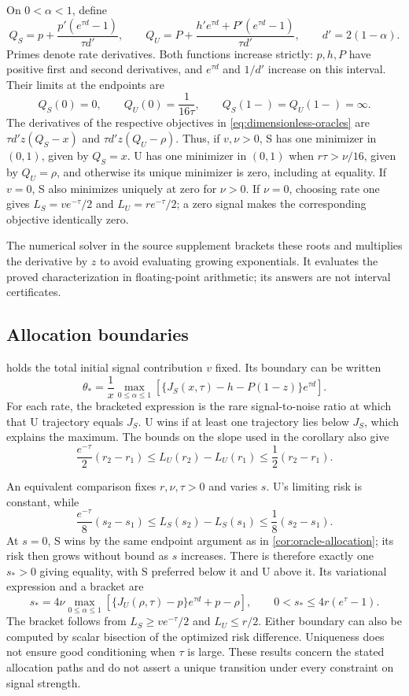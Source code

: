 \documentclass{alt2027}
\begin{document}
On $0 < \alpha < 1$, define
\[
  Q_S = p + \frac{p'(e^{\tau d} - 1)}{\tau d'},\qquad Q_U
      = P + \frac{h'e^{\tau d} + P'(e^{\tau d} - 1)}{\tau d'}, \qquad d'
      = 2(1 - \alpha).
\]
Primes denote rate derivatives. Both functions increase strictly: $p,h,P$ have
positive first and second derivatives, and $e^{\tau d}$ and $1/d'$ increase on
this interval. Their limits at the endpoints are
\[
  Q_S(0) = 0,\qquad Q_U(0) = \frac{1}{16\tau},\qquad Q_S(1-) = Q_U(1-) = \infty.
\]
The derivatives of the respective objectives in \cref{eq:dimensionless-oracles}
are $\tau d'z(Q_S - x)$ and $\tau d'z(Q_U - \rho)$. Thus, if $v,\nu > 0$, S has
one minimizer in $(0,1)$, given by $Q_S = x$. U has one minimizer in $(0,1)$
when $r\tau > \nu/16$, given by $Q_U = \rho$, and otherwise its unique minimizer
is zero, including at equality. If $v = 0$, S also minimizes uniquely at zero
for $\nu > 0$. If $\nu = 0$, choosing rate one gives $L_S = ve^{-\tau}/2$ and
$L_U = re^{-\tau}/2$; a zero signal makes the corresponding objective
identically zero.

The numerical solver in the source supplement brackets these roots and
multiplies the derivative by $z$ to avoid evaluating growing exponentials. It
evaluates the proved characterization in floating-point arithmetic; its answers
are not interval certificates.

\subsection{Allocation boundaries}

 holds the total initial signal contribution $v$
fixed. Its boundary can be written
\begin{equation}
  \theta_* = \frac1x\max_{0 \leq \alpha \leq 1} \left[ \{J_S(x,\tau) - h - P(1 - z)\}e^{\tau d} \right].
\end{equation}
For each rate, the bracketed expression is the rare signal-to-noise ratio at
which that U trajectory equals $J_S$. U wins if at least one trajectory lies
below $J_S$, which explains the maximum. The bounds on the slope used in the
corollary also give
\[
  \frac{e^{-\tau}}2(r_2 - r_1) \leq L_U(r_2) - L_U(r_1) \leq \frac12(r_2 - r_1).
\]

An equivalent comparison fixes $r,\nu,\tau > 0$ and varies $s$. U's limiting
risk is constant, while
\[
  \frac{e^{-\tau}}8(s_2 - s_1) \leq L_S(s_2) - L_S(s_1) \leq \frac18(s_2 - s_1).
\]
At $s = 0$, S wins by the same endpoint argument as in
\cref{cor:oracle-allocation}; its risk then grows without bound as $s$
increases. There is therefore exactly one $s_* > 0$ giving equality, with S
preferred below it and U above it. Its variational expression and a bracket are
\[
  s_*
  =    4\nu\max_{0 \leq \alpha \leq 1} \left[ \{J_U(\rho,\tau) - p\}e^{\tau d} + p - \rho \right], \qquad 0
  <    s_*
  \leq 4r(e^\tau - 1).
\]
The bracket follows from $L_S \geq ve^{-\tau}/2$ and $L_U \leq r/2$. Either
boundary can also be computed by scalar bisection of the optimized risk
difference. Uniqueness does not ensure good conditioning when $\tau$ is large.
These results concern the stated allocation paths and do not assert a unique
transition under every constraint on signal strength.
\end{document}
